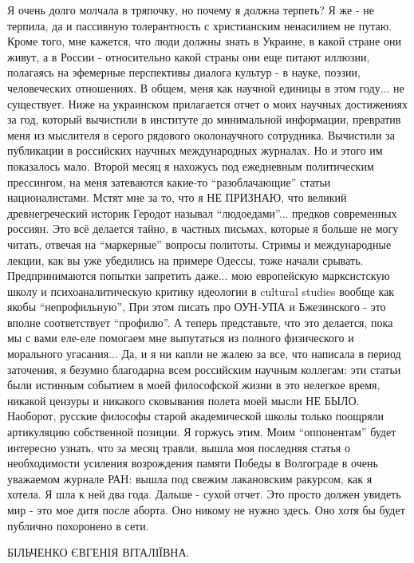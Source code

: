 Я очень долго молчала в тряпочку, но почему я должна терпеть? Я же - не
терпила, да и пассивную толерантность с христианским ненасилием не путаю. Кроме
того, мне кажется, что люди должны знать в Украине, в какой стране они живут, а
в России - относительно какой страны они еще питают иллюзии, полагаясь на
эфемерные перспективы диалога культур - в науке, поэзии, человеческих
отношениях. В общем, меня как научной единицы в этом году... не существует.
Ниже на украинском прилагается отчет о моих научных достижениях за год, который
вычистили в институте до минимальной информации, превратив меня из мыслителя в
серого рядового околонаучного сотрудника. Вычистили за публикации в российских
научных международных журналах. Но и этого им показалось мало. Второй месяц я
нахожусь под ежедневным политическим прессингом, на меня затеваются какие-то
\enquote{разоблачающие} статьи националистами. Мстят мне за то, что я НЕ ПРИЗНАЮ, что
великий древнегреческий историк Геродот называл \enquote{людоедами}... предков
современных россиян. Это всё делается тайно, в частных письмах, которые я
больше не могу читать, отвечая на \enquote{маркерные} вопросы политоты. Стримы и
международные лекции, как вы уже убедились на примере Одессы, тоже начали
срывать. Предпринимаются попытки запретить даже... мою европейскую марксистскую
школу и психоаналитическую критику идеологии в cultural studies вообще как
якобы \enquote{непрофильную}, При этом писать про ОУН-УПА и Бжезинского - это вполне
соответствует \enquote{профилю}. А теперь представьте, что это делается, пока мы с вами
еле-еле помогаем мне выпутаться из полного физического и морального угасания...
Да, и я ни капли не жалею за все, что написала в период заточения, я безумно
благодарна всем российским научным коллегам: эти статьи были истинным событием
в моей философской жизни в это нелегкое время, никакой цензуры и никакого
сковывания полета моей мысли НЕ БЫЛО. Наоборот, русские философы старой
академической школы только поощряли артикуляцию собственной позиции. Я горжусь
этим. Моим \enquote{оппонентам} будет интересно узнать, что за месяц травли, вышла моя
последняя статья о необходимости усиления возрождения памяти Победы в
Волгограде в очень уважаемом журнале РАН: вышла под свежим лакановским
ракурсом, как я хотела. Я шла к ней два года. Дальше - сухой отчет. Это просто
должен увидеть мир - это мое дитя после аборта. Оно никому не нужно здесь. Оно
хотя бы будет публично похоронено в сети.

БІЛЬЧЕНКО ЄВГЕНІЯ ВІТАЛІЇВНА.

